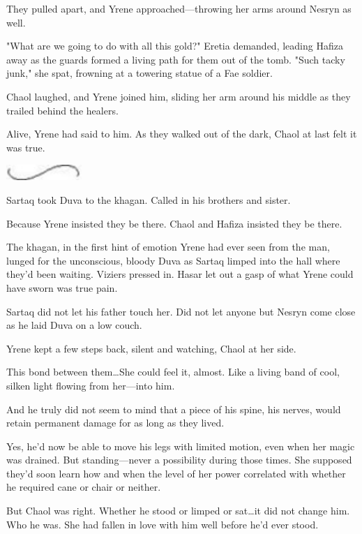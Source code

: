 They pulled apart, and Yrene approached---throwing her arms around Nesryn as well.

"What are we going to do with all this gold?"
Eretia demanded, leading Hafiza away as the guards formed a living path for them out of the tomb.
"Such tacky junk," she spat, frowning at a towering statue of a Fae soldier.

Chaol laughed, and Yrene joined him, sliding her arm around his middle as they trailed behind the healers.

Alive, Yrene had said to him.
As they walked out of the dark, Chaol at last felt it was true.

\begin{center}
	\includegraphics[width=1.12in,height=0.24in]{images/seperator}
\end{center}

Sartaq took Duva to the khagan.
Called in his brothers and sister.

Because Yrene insisted they be there.
Chaol and Hafiza insisted they be there.

The khagan, in the first hint of emotion Yrene had ever seen from the man, lunged for the unconscious, bloody Duva as Sartaq limped into the hall where they'd been waiting.
Viziers pressed in.
Hasar let out a gasp of what Yrene could have sworn was true pain.

Sartaq did not let his father touch her.
Did not let anyone but Nesryn come close as he laid Duva on a low couch.

Yrene kept a few steps back, silent and watching, Chaol at her side.

This bond between them\ldots She could feel it, almost.
Like a living band of cool, silken light flowing from her---into him.

And he truly did not seem to mind that a piece of his spine, his nerves, would retain permanent damage for as long as they lived.

Yes, he'd now be able to move his legs with limited motion, even when her magic was drained.
But standing---never a possibility during those times.
She supposed they'd soon learn how and when the level of her power correlated with whether he required cane or chair or neither.

But Chaol was right.
Whether he stood or limped or sat\ldots it did not change him.
Who he was.
She had fallen in love with him well before he'd ever stood.

